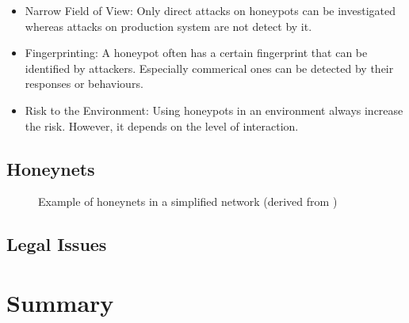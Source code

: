 \begin{itemize}
    \item Narrow Field of View: Only direct attacks on honeypots can be investigated whereas attacks on production system are not detect by it.
    \item Fingerprinting: A honeypot often has a certain fingerprint that can be identified by attackers. Especially commerical ones can be detected by their responses or behaviours. 
    \item Risk to the Environment: Using honeypots in an environment always increase the risk. However, it depends on the level of interaction.
\end{itemize}

\subsection{Honeynets}

\begin{figure}[h]
    \centering
    
    \caption{Example of honeynets in a simplified network (derived from \cite{Spitzner2003})}
    \label{fig:honeynet-example}
\end{figure}

\cite{Spitzner2003}

\subsection{Legal Issues}

\cite{Spitzner2003}

\section{Summary}

